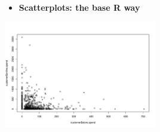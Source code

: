 \documentclass[
  ignorenonframetext,
]{beamer}
\newenvironment{Shaded}{\begin{snugshade}}{\end{snugshade}}
\newcommand{\AttributeTok}[1]{\textcolor[rgb]{0.40,0.45,0.13}{#1}}
\newcommand{\FunctionTok}[1]{\textcolor[rgb]{0.28,0.35,0.67}{#1}}
\newcommand{\NormalTok}[1]{\textcolor[rgb]{0.00,0.23,0.31}{#1}}
\newcommand{\SpecialCharTok}[1]{\textcolor[rgb]{0.37,0.37,0.37}{#1}}
\providecommand{\tightlist}{%
  \setlength{\itemsep}{0pt}\setlength{\parskip}{0pt}}\usepackage{longtable,booktabs,array}
\begin{document}
\begin{frame}[fragile]{}
\label{section-8}
\begin{itemize}
\tightlist
\item
  \textbf{Scatterplots: the base R way}
\end{itemize}

\tiny

\begin{Shaded}
\end{Shaded}

\begin{center}
\includegraphics[width=0.5\textwidth,height=\textheight]{004_relationships_between_continuous_variables_files/figure-beamer/unnamed-chunk-6-1.pdf}
\end{center}
\end{frame}
\end{document}
